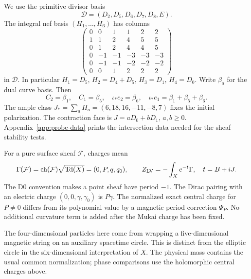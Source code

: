 We use the primitive divisor basis
\begin{equation}
 \mathcal D=(D_2,D_5,D_6,D_7,D_8,E).
 \label{eq:x9-divisor-basis}
\end{equation}
The integral nef basis $(H_1,\ldots,H_6)$ has columns
\begin{equation}
 \begin{pmatrix}
 0&0&1&1&2&2\\1&1&2&4&5&5\\0&1&2&4&4&5\\
 0&-1&-1&-3&-3&-3\\0&-1&-1&-2&-2&-2\\0&0&1&2&2&2
 \end{pmatrix}
 \label{eq:x9-mirror-nef}
\end{equation}
in $\mathcal D$. In particular
$H_1=D_5$, $H_2=D_4+D_5$, $H_3=D_1$, $H_4=D_0$.
Write $\beta_a$ for the dual curve basis. Then
\begin{equation}
 C_2=\beta_1,\quad C_1=\beta_5,\quad
 \iota_*e_2=\beta_6,\quad
 \iota_*e_1=\beta_1+\beta_5+\beta_6.
\end{equation}
The ample class $J_*=
\sum_aH_a=(6,18,16,-11,-8,7)$ fixes the initial polarization.
The contraction face is $J=aD_0+bD_1$, $a,b\geq0$.
Appendix~\ref{app:probe-data} prints the intersection data
needed for the sheaf stability tests.

For a pure surface sheaf $\mathcal F$, charges mean
\begin{equation}
 \Gamma(\mathcal F)=\operatorname{ch}(\mathcal F)
          \sqrt{\operatorname{Td}(X)}=(0,P,q,q_0),\qquad
 Z_{\rm LV}=-\int_Xe^{-t}\Gamma,\quad t=B+iJ.
\end{equation}
The D0 convention makes a point sheaf have period $-1$.
The Dirac pairing with an electric charge
$(0,0,\gamma,\gamma_0)$ is $P\gamma$.
The normalized exact central charge for $P\neq0$ differs
from its polynomial value by a magnetic period correction
$\Psi_P$. No additional curvature term is added after the
Mukai charge has been fixed.

The four-dimensional particles here come from wrapping a
five-dimensional magnetic string on an auxiliary spacetime
circle. This is distinct from the elliptic circle in the
six-dimensional interpretation of $X$. The physical mass
contains the usual common normalization; phase comparisons
use the holomorphic central charges above.

